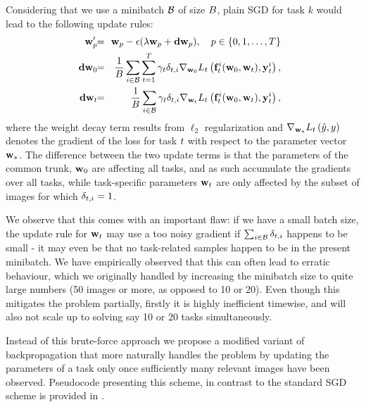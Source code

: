 \documentclass[10pt,twocolumn,letterpaper]{article}
\begin{document}
Considering that we use a  minibatch $\mathcal{B}$  of size $B$, plain SGD for task $k$ would lead to the following update rules:  %
\begin{eqnarray}
\!\!\!\!\prm{\tast}' \!\!&=&\!\! \prm{\tast} - \epsilon (\lambda \prm{\tast} + \mathbf{dw}_{\tast}), \quad \tast \in \{\cnn,1,\ldots,T\}\\
\!\!\!\!\mathbf{dw}_{\cnn} \!\!&=& \!\!  \frac{1}{\bs}\sum_{\bi \in \mb}\sum_{\task=1}^T \gamma_{\task}  \mydelta{\task}{\bi} \lossdd{\task}{\prd{\task}{\bi}(\prm{\cnn},\prm{\task})}{\gt{\task}{\bi}}{\prm{\cnn}},  
\\
\!\!\!\!\mathbf{dw}_{\task} \!\!&=&\!\!  \frac{1}{\bs}\sum_{\bi \in \mb} \gamma_{\task}\mydelta{\task}{\bi}\lossdd{\task}{\prd{\task}{\bi}(\prm{\cnn},\prm{\task})}{\gt{\task}{\bi}}{\prm{\mathrm{\task}}}, 
\end{eqnarray}
where the weight decay term results from $\ell_2$ regularization and $\nabla_{\mathbf{w}_{\ast}}L_{t}\left(\hat{y},y\right)$
denotes the gradient of the loss for task $t$  with respect to the parameter vector ${\mathbf{w}_{\ast}}$. The difference between the two update terms is that the parameters of the common  trunk, $\mathbf{w}_{0}$ are affecting all tasks, and as such accumulate the gradients over all tasks, while task-specific parameters $\mathbf{w}_{t}$ are only affected by the subset of images for which $\delta_{t,i}=1$. 



We observe that this comes with an important flaw: if we have a small batch size, the update rule for $\mathbf{w}_{t}$ may use a too noisy gradient if  $\sum_{i \in  \mathcal{B}} \delta_{t,i}$ happens to be small  -  it may even be that no task-related samples happen to be in the present minibatch. We have empirically observed that this can often lead to erratic behaviour, which we originally handled  by increasing the minibatch size to quite large numbers (50 images or more, as opposed to 10 or 20). Even though this mitigates the problem partially, firstly it is highly inefficient timewise, and will also not scale up to solving say 10 or 20 tasks simultaneously. 


Instead of this brute-force approach we propose a modified variant of backpropagation that more naturally handles the problem
by updating the parameters of a task only once sufficiently many relevant images have been observed. 
Pseudocode presenting this scheme, in contrast to the standard SGD scheme is provided in . 
\end{document}
